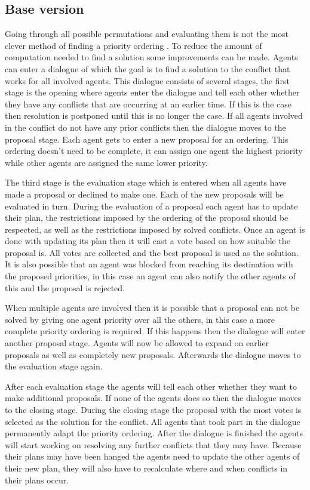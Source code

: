 \subsection{Base version}
Going through all possible permutations and evaluating them is not the most
clever method of finding a priority ordering \cite{bennewitz2002}. To reduce
the amount of computation needed to find a solution some improvements can be
made. Agents can enter a dialogue of which the goal is to find a solution to
the conflict that works for all involved agents. This dialogue consists of
several stages, the first stage is the opening where agents enter the dialogue
and tell each other whether they have any conflicts that are occurring at an
earlier time. If this is the case then resolution is postponed until this is
no longer the case. If all agents involved in the conflict do not have any
prior conflicts then the dialogue moves to the proposal stage. Each agent
gets to enter a new proposal for an ordering. This ordering doesn't need to be
complete, it can assign one agent the highest priority while other agents are
assigned the same lower priority.

The third stage is the evaluation stage which is entered when all agents have
made a proposal or declined to make one. Each of the new proposals will be
evaluated in turn. During the evaluation of a proposal each agent has to update
their plan, the restrictions imposed by the ordering of the proposal should be
respected, as well as the restrictions imposed by solved conflicts. Once an
agent is done with updating its plan then it will cast a vote based on how
suitable the proposal is. All votes are collected and the best proposal is
used as the solution. It is also possible that an agent was blocked from
reaching its destination with the proposed priorities, in this case an agent
can also notify the other agents of this and the proposal is rejected.

When multiple agents are involved then it is possible that a proposal can not
be solved by giving one agent priority over all the others, in this case a more
complete priority ordering is required. If this happens then the dialogue will
enter another proposal stage. Agents will now be allowed to expand on earlier
proposals as well as completely new proposals. Afterwards the dialogue moves to
the evaluation stage again.

After each evaluation stage the agents will tell each other whether they want
to make additional proposals. If none of the agents does so then the dialogue
moves to the closing stage. During the closing stage the proposal with the most
votes is selected as the solution for the conflict. All agents that took part
in the dialogue permanently adapt the priority ordering. After the dialogue is
finished the agents will start working on resolving any further conflicts that
they may have. Because their plans may have been hanged the agents need to
update the other agents of their new plan, they will also have to recalculate
where and when conflicts in their plans occur.

